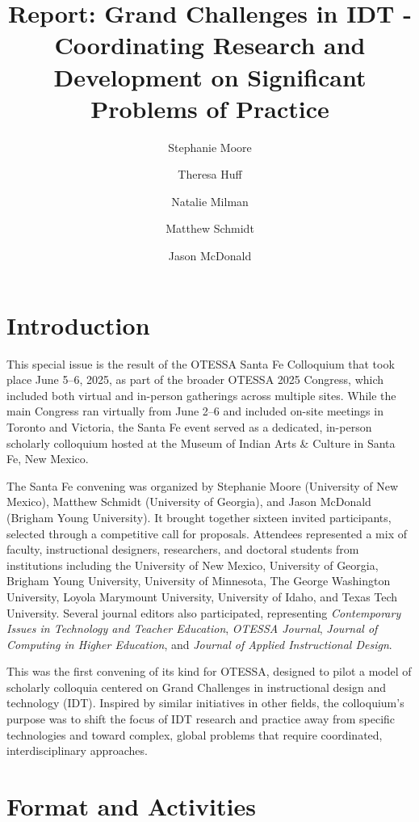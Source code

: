 \documentclass[
  letterpaper,
  DIV=11,
  numbers=noendperiod]{scrartcl}
\title{Report: Grand Challenges in IDT - Coordinating Research and
Development on Significant Problems of Practice}
\author{Stephanie Moore \and Theresa Huff \and Natalie
Milman \and Matthew Schmidt \and Jason McDonald}
\date{}
\makeatletter
\renewcommand{\maketitle}{\bgroup\setlength{\parindent}{0pt}
\begin{flushleft}
  {\sffamily\huge\textbf{\MakeUppercase{\@title}}} \vspace{0.3cm} \newline
  {\Large {\@subtitle}} \newline
  \@author
\end{flushleft}\egroup
}
\makeatother
\begin{document}
\maketitle

\pagestyle{mystyle}


\section{\texorpdfstring{\textbf{Introduction}}{Introduction}}\label{introduction}

This special issue is the result of the OTESSA Santa Fe Colloquium that
took place June 5--6, 2025, as part of the broader OTESSA 2025 Congress,
which included both virtual and in-person gatherings across multiple
sites. While the main Congress ran virtually from June 2--6 and included
on-site meetings in Toronto and Victoria, the Santa Fe event served as a
dedicated, in-person scholarly colloquium hosted at the Museum of Indian
Arts \& Culture in Santa Fe, New Mexico.

The Santa Fe convening was organized by Stephanie Moore (University of
New Mexico), Matthew Schmidt (University of Georgia), and Jason McDonald
(Brigham Young University). It brought together sixteen invited
participants, selected through a competitive call for proposals.
Attendees represented a mix of faculty, instructional designers,
researchers, and doctoral students from institutions including the
University of New Mexico, University of Georgia, Brigham Young
University, University of Minnesota, The George Washington University,
Loyola Marymount University, University of Idaho, and Texas Tech
University. Several journal editors also participated, representing
\emph{Contemporary Issues in Technology and Teacher Education},
\emph{OTESSA Journal}, \emph{Journal of Computing in Higher Education},
and \emph{Journal of Applied Instructional Design}.

This was the first convening of its kind for OTESSA, designed to pilot a
model of scholarly colloquia centered on Grand Challenges in
instructional design and technology (IDT). Inspired by similar
initiatives in other fields, the colloquium's purpose was to shift the
focus of IDT research and practice away from specific technologies and
toward complex, global problems that require coordinated,
interdisciplinary approaches.

\section{Format and Activities}\label{format-and-activities}
\end{document}

